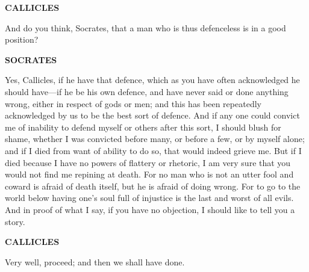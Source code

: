 \documentclass[11pt,letter]{article}
\begin{document}
\par \textbf{CALLICLES}
\par   And do you think, Socrates, that a man who is thus defenceless is in a good position?

\par \textbf{SOCRATES}
\par   Yes, Callicles, if he have that defence, which as you have often acknowledged he should have—if he be his own defence, and have never said or done anything wrong, either in respect of gods or men; and this has been repeatedly acknowledged by us to be the best sort of defence. And if any one could convict me of inability to defend myself or others after this sort, I should blush for shame, whether I was convicted before many, or before a few, or by myself alone; and if I died from want of ability to do so, that would indeed grieve me. But if I died because I have no powers of flattery or rhetoric, I am very sure that you would not find me repining at death. For no man who is not an utter fool and coward is afraid of death itself, but he is afraid of doing wrong. For to go to the world below having one’s soul full of injustice is the last and worst of all evils. And in proof of what I say, if you have no objection, I should like to tell you a story.

\par \textbf{CALLICLES}
\par   Very well, proceed; and then we shall have done.
\end{document}
